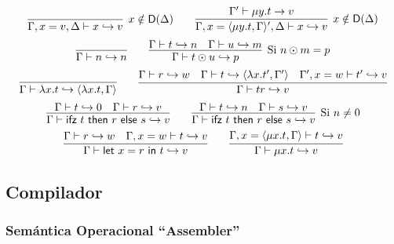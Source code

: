 \documentclass[twoside,a4paper,12pt]{article}
\theoremstyle{definition}
\theoremstyle{remark}
\begin{document}
\begin{equation*}
  \infer[x\notin\mathsf D(\Delta)]
    {\Gamma,x=v,\Delta\vdash x\hra v}
    {}
  \qquad
  \infer[x\notin\mathsf D(\Delta)]
    {\Gamma,x=\thunk{\fix yt}\Gamma',\Delta\vdash x\hra v}
    {\Gamma'\vdash\fix yt\to v}
\end{equation*}
\begin{equation*}
  \infer{\Gamma\vdash n\hra n}{}
  \qquad
  \infer[\textrm{Si }n\odot m=p]
    {\Gamma\vdash t\odot u\hra p}
    {\Gamma\vdash t\hra n & \Gamma\vdash u\hra m }
\end{equation*}
\begin{equation*}
  \infer
    {\Gamma\vdash\fun xt\hra\thunk {\fun xt}\Gamma}
    {}
  \qquad
  \infer
    {\Gamma\vdash tr\hra v}
    {
      \Gamma\vdash r\hra w
      &\Gamma\vdash t\hra\thunk {\fun x{t'}}{\Gamma'}
      &\Gamma',x=w\vdash t'\hra v
    }
\end{equation*}
\begin{equation*}
  \infer{\Gamma\vdash \ifz trs\hra v} { \Gamma\vdash t\hra 0 & \Gamma\vdash
    r\hra v }
    \qquad
    \infer[\textrm{Si }n\neq 0]
    {\Gamma\vdash \ifz trs\hra v}
  { \Gamma\vdash t\hra n & \Gamma\vdash s\hra v }
\end{equation*}
\begin{equation*}
  \infer{\Gamma\vdash\letl xrt\hra v} { \Gamma\vdash r\hra w &
    \Gamma,x=w\vdash t\hra v }
    \qquad \infer{\Gamma\vdash\fix xt\hra v}
  {\Gamma,x=\thunk{\fix xt}\Gamma\vdash t\hra v}
\end{equation*}

\newpage
\subsection*{Compilador}

\subsubsection*{Semántica Operacional ``Assembler''}
\end{document}
